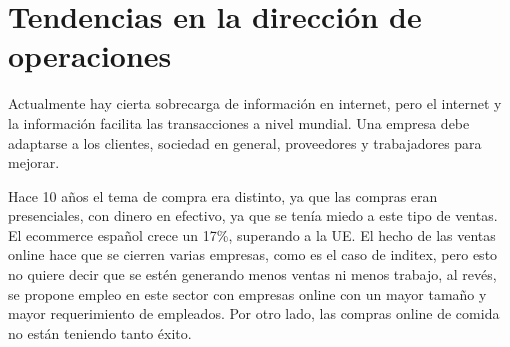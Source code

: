 \documentclass[12pt]{book} %
\begin{document}
\hypertarget{tendencias-en-la-direcciuxf3n-de-operaciones}{%
\section{Tendencias en la dirección de
operaciones}\label{tendencias-en-la-direcciuxf3n-de-operaciones}}

Actualmente hay cierta sobrecarga de información en internet, pero el
internet y la información facilita las transacciones a nivel mundial.
Una empresa debe adaptarse a los clientes, sociedad en general,
proveedores y trabajadores para mejorar.

Hace 10 años el tema de compra era distinto, ya que las compras eran
presenciales, con dinero en efectivo, ya que se tenía miedo a este tipo
de ventas. El ecommerce español crece un 17\%, superando a la UE. El
hecho de las ventas online hace que se cierren varias empresas, como es
el caso de inditex, pero esto no quiere decir que se estén generando
menos ventas ni menos trabajo, al revés, se propone empleo en este
sector con empresas online con un mayor tamaño y mayor requerimiento de
empleados. Por otro lado, las compras online de comida no están teniendo
tanto éxito.
\end{document}
